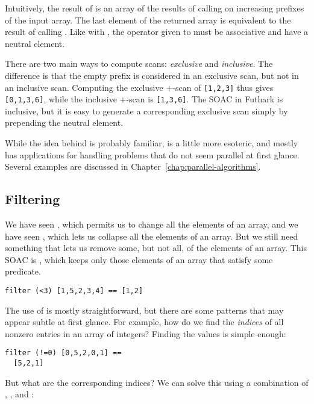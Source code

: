 \documentclass[oneside,11pt]{book}
\begin{document}
Intuitively, the result of  is an array of the results of calling
 on increasing prefixes of the input array.  The last
element of the returned array is equivalent to the result of calling
. Like with , the operator given to
 must be associative and have a neutral element.

There are two main ways to compute scans: \textit{exclusive} and
\textit{inclusive}.  The difference is that the empty prefix is
considered in an exclusive scan, but not in an inclusive scan.
Computing the exclusive $+$-scan of \texttt{[1,2,3]} thus gives
\texttt{[0,1,3,6]}, while the inclusive $+$-scan is \texttt{[1,3,6]}.
The  SOAC in Futhark is inclusive, but it is easy to
generate a corresponding exclusive scan simply by prepending the
neutral element.

While the idea behind  is probably familiar,  is
a little more esoteric, and mostly has applications for handling
problems that do not seem parallel at first glance.  Several examples
are discussed in Chapter~\ref{chap:parallel-algorithms}.

\subsection{Filtering}

We have seen , which permits us to change all the elements of
an array, and we have seen , which lets us collapse all
the elements of an array.  But we still need something that lets us
remove some, but not all, of the elements of an array.  This SOAC is
, which keeps only those elements of an array that satisfy
some predicate.

\begin{lstlisting}
filter (<3) [1,5,2,3,4] == [1,2]
\end{lstlisting}

The use of  is mostly straightforward, but there are
some patterns that may appear subtle at first glance.  For example,
how do we find the \textit{indices} of all nonzero entries in an array
of integers?  Finding the values is simple enough:

\begin{lstlisting}
filter (!=0) [0,5,2,0,1] ==
  [5,2,1]
\end{lstlisting}

\noindent
But what are the corresponding indices?  We can solve this using a
combination of , , and :
\end{document}
